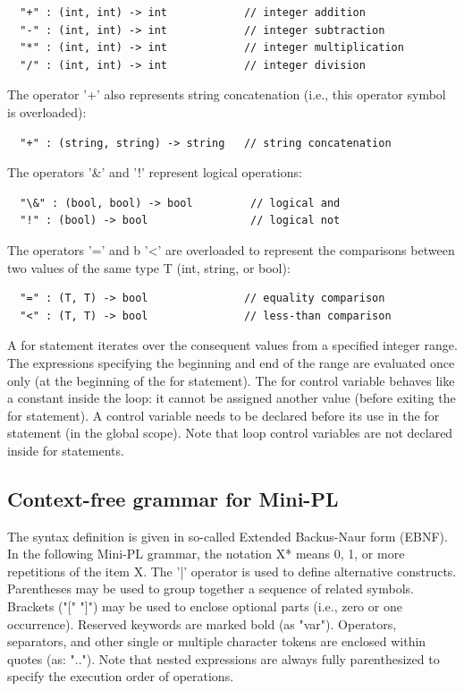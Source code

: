 \documentclass{article}
\begin{document}
\begin{verbatim}
  "+" : (int, int) -> int            // integer addition
  "-" : (int, int) -> int            // integer subtraction
  "*" : (int, int) -> int            // integer multiplication
  "/" : (int, int) -> int            // integer division
\end{verbatim}
The operator '+' also represents string concatenation (i.e., this operator
symbol is overloaded):

\begin{verbatim}
  "+" : (string, string) -> string   // string concatenation
\end{verbatim}
The operators '\&' and '!' represent logical operations:

\begin{verbatim}
  "\&" : (bool, bool) -> bool         // logical and
  "!" : (bool) -> bool                // logical not
\end{verbatim}
The operators '=' and b '<' are overloaded to represent the comparisons between
two values of the same type T (int, string, or bool):

\begin{verbatim}
  "=" : (T, T) -> bool               // equality comparison
  "<" : (T, T) -> bool               // less-than comparison
\end{verbatim}
A for statement iterates over the consequent values from a specified integer
range. The expressions specifying the beginning and end of the range are
evaluated once only (at the beginning of the for statement). The for control
variable behaves like a constant inside the loop: it cannot be assigned another
value (before exiting the for statement). A control variable needs to be
declared before its use in the for statement (in the global scope). Note that
loop control variables are not declared inside for statements.

\subsection{Context-free grammar for Mini-PL}
The syntax definition is given in so-called Extended Backus-Naur form (EBNF).
In the following Mini-PL grammar, the notation X* means 0, 1, or more
repetitions of the item X. The '|' operator is used to define alternative
constructs. Parentheses may be used to group together a sequence of related
symbols. Brackets ("[" "]") may be used to enclose optional parts (i.e., zero
or one occurrence). Reserved keywords are marked bold (as "var"). Operators,
separators, and other single or multiple character tokens are enclosed within
quotes (as: ".."). Note that nested expressions are always fully parenthesized
to specify the execution order of operations.
\end{document}
